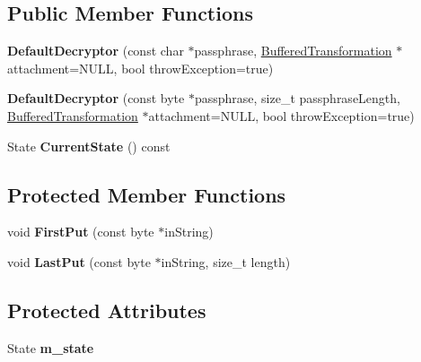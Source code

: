 \subsection*{Public Member Functions}
\begin{DoxyCompactItemize}
\item 
\hypertarget{class_default_decryptor_abccfb4027c9af76b33c242d4cbda6879}{
{\bfseries DefaultDecryptor} (const char $\ast$passphrase, \hyperlink{class_buffered_transformation}{BufferedTransformation} $\ast$attachment=NULL, bool throwException=true)}
\label{class_default_decryptor_abccfb4027c9af76b33c242d4cbda6879}

\item 
\hypertarget{class_default_decryptor_adceb654320c139fa8d0d13f88a98afc6}{
{\bfseries DefaultDecryptor} (const byte $\ast$passphrase, size\_\-t passphraseLength, \hyperlink{class_buffered_transformation}{BufferedTransformation} $\ast$attachment=NULL, bool throwException=true)}
\label{class_default_decryptor_adceb654320c139fa8d0d13f88a98afc6}

\item 
\hypertarget{class_default_decryptor_ab234c4a12f36612544dadd97970b695b}{
State {\bfseries CurrentState} () const }
\label{class_default_decryptor_ab234c4a12f36612544dadd97970b695b}

\end{DoxyCompactItemize}
\subsection*{Protected Member Functions}
\begin{DoxyCompactItemize}
\item 
\hypertarget{class_default_decryptor_aa1ee016673cf4154c9b20f287ba206d3}{
void {\bfseries FirstPut} (const byte $\ast$inString)}
\label{class_default_decryptor_aa1ee016673cf4154c9b20f287ba206d3}

\item 
\hypertarget{class_default_decryptor_a3b8b9a23c00e6ccaae81b1d3e6ebb3e7}{
void {\bfseries LastPut} (const byte $\ast$inString, size\_\-t length)}
\label{class_default_decryptor_a3b8b9a23c00e6ccaae81b1d3e6ebb3e7}

\end{DoxyCompactItemize}
\subsection*{Protected Attributes}
\begin{DoxyCompactItemize}
\item 
\hypertarget{class_default_decryptor_a9b887466b08abc8eea2c2825b9ab3d2d}{
State {\bfseries m\_\-state}}
\label{class_default_decryptor_a9b887466b08abc8eea2c2825b9ab3d2d}

\end{DoxyCompactItemize}


